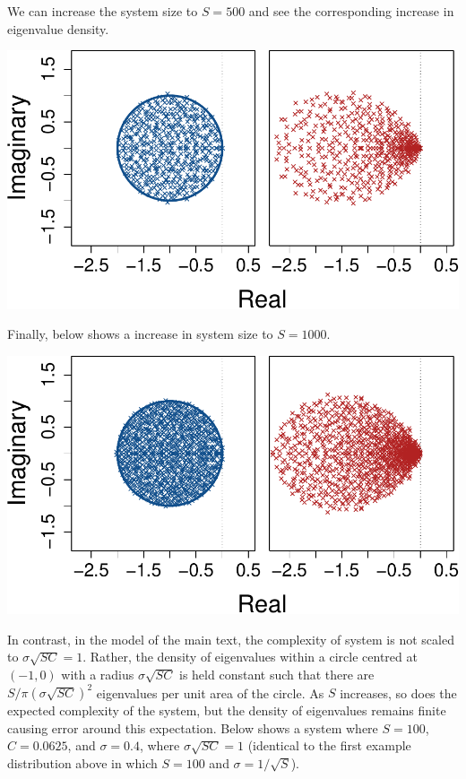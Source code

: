 \documentclass[]{article}
\begin{document}
We can increase the system size to \(S = 500\) and see the corresponding
increase in eigenvalue density.

\includegraphics{unnamed-chunk-38-1.pdf}

Finally, below shows a increase in system size to \(S = 1000\).

\includegraphics{unnamed-chunk-39-1.pdf}

In contrast, in the model of the main text, the complexity of system is
not scaled to \(\sigma\sqrt{SC} = 1\). Rather, the density of
eigenvalues within a circle centred at \((-1, 0)\) with a radius
\(\sigma\sqrt{SC}\) is held constant such that there are
\(S / \pi(\sigma\sqrt{SC})^2\) eigenvalues per unit area of the circle.
As \(S\) increases, so does the expected complexity of the system, but
the density of eigenvalues remains finite causing error around this
expectation. Below shows a system where \(S = 100\), \(C = 0.0625\), and
\(\sigma = 0.4\), where \(\sigma \sqrt{SC} = 1\) (identical to the first
example distribution above in which \(S = 100\) and
\(\sigma = 1/\sqrt{S}\)).
\end{document}
